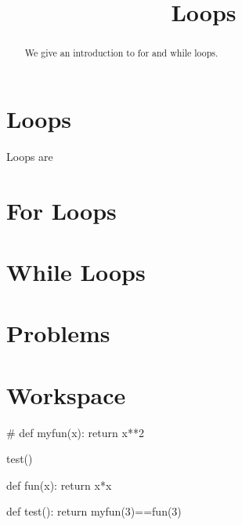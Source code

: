 \documentclass{ximera}
\title{Loops}
\begin{document}
  
\begin{abstract}  
We give an introduction to for and while loops.
\end{abstract}  
\maketitle

\section{Loops}

Loops are 

\section{For Loops}

\section{While Loops}

\section{Problems}

\begin{question}
\end{question}

\begin{question}
\end{question}

\section{Workspace}


\begin{sageCell}
#
def myfun(x):
        return x**2

test()
\end{sageCell}

\begin{expandable}
\begin{sageCell}
def fun(x):
        return x*x

def test():
	return myfun(3)==fun(3)
\end{sageCell}
\end{expandable}
\end{document}
